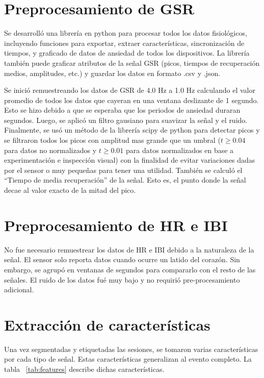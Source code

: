 \section{Preprocesamiento de GSR}\label{secc:gsrpreprocessing}
Se desarroll\'o una librer\'ia en python para procesar todos los datos fisiol\'ogicos, incluyendo funciones para exportar, extraer caracter\'isticas, sincronizaci\'on de tiempos, y graficado de datos de ansiedad de todos los dispositivos. La librer\'ia tambi\'en puede graficar atributos de la se\~nal GSR (picos, tiempos de recuperaci\'on medios, amplitudes, etc.) y guardar los datos en formato .csv y .json.

Se inici\'o remuestreando los datos de GSR de 4.0 Hz a 1.0 Hz calculando el valor promedio de todos los datos que cayeran en una ventana deslizante de 1 segundo. Esto se hizo debido a que se esperaba que los periodos de ansiedad duraran segundos. Luego, se aplic\'o un filtro gausiano para suavizar la se\~nal y el ruido. Finalmente, se us\'o un m\'etodo de la librer\'ia scipy de python para detectar picos y se filtraron todos los picos con amplitud mas grande que un umbral ($t \geqslant 0.04$ para datos no normalizados y $t \geqslant 0.01$ para datos normalizados en base a experimentaci\'on e inspecci\'on visual) con la finalidad de evitar variaciones dadas por el sensor o muy peque\~nas para tener una utilidad. Tambi\'en se calcul\'o el ``Tiempo de media recuperaci\'on'' de la se\~nal. Esto es, el punto donde la se\~nal decae al valor exacto de la mitad del pico.
\section{Preprocesamiento de HR e IBI}\label{secc:hribipreprocessing}
No fue necesario remuestrear los datos de HR e IBI debido a la naturaleza de la se\~nal. El sensor solo reporta datos cuando ocurre un latido del coraz\'on. Sin embargo, se agrup\'o en ventanas de segundos para compararlo con el resto de las se\~nales. El ruido de los datos fu\'e muy bajo y no requiri\'o pre-procesamiento adicional.
\section{Extracci\'on de caracter\'isticas}
Una vez segmentadas y etiquetadas las sesiones, se tomaron varias caracter\'isticas por cada tipo de se\~nal. Estas caracter\'isticas generalizan al evento completo. La tabla ~\ref{tab:features} describe dichas caracter\'isticas.

